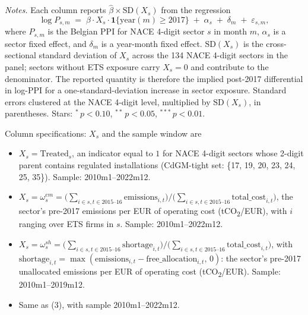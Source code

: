 \begin{table}[H]
    \begin{minipage}{0.95\textwidth}
        \footnotesize
        \vspace{0.5em}
        \emph{Notes.} Each column reports $\hat\beta \times \text{SD}(X_s)$ from the regression
        \[
            \log P_{s,m} \;=\; \beta \cdot X_s \cdot \mathbf{1}\{\text{year}(m) \geq 2017\} \;+\; \alpha_s \;+\; \delta_m \;+\; \varepsilon_{s,m},
        \]
        where $P_{s,m}$ is the Belgian PPI for NACE 4-digit sector $s$ in month $m$, $\alpha_s$ is a sector fixed effect, and $\delta_m$ is a year-month fixed effect. $\text{SD}(X_s)$ is the cross-sectional standard deviation of $X_s$ across the 134 NACE 4-digit sectors in the panel; sectors without ETS exposure carry $X_s = 0$ and contribute to the denominator. The reported quantity is therefore the implied post-2017 differential in log-PPI for a one-standard-deviation increase in sector exposure. Standard errors clustered at the NACE 4-digit level, multiplied by $\text{SD}(X_s)$, in parentheses. Stars: $^{*}\,p<0.10$, $^{**}\,p<0.05$, $^{***}\,p<0.01$.

        \vspace{0.5em}
        Column specifications: $X_s$ and the sample window are
        \begin{itemize}
            \item[(1)] $X_s = \text{Treated}_s$, an indicator equal to $1$ for NACE 4-digit sectors whose 2-digit parent contains regulated installations (CdGM-tight set: \{17, 19, 20, 23, 24, 25, 35\}). Sample: 2010m1--2022m12.
            \item[(2)] $X_s = \omega^{em}_s = \big(\sum_{i \in s, t \in 2015\text{--}16} \text{emissions}_{i,t}\big) / \big(\sum_{i \in s, t \in 2015\text{--}16} \text{total\_cost}_{i,t}\big)$, the sector's pre-2017 emissions per EUR of operating cost (tCO\textsubscript{2}/EUR), with $i$ ranging over ETS firms in $s$. Sample: 2010m1--2022m12.
            \item[(3)] $X_s = \omega^{sh}_s = \big(\sum_{i \in s, t \in 2015\text{--}16} \text{shortage}_{i,t}\big) / \big(\sum_{i \in s, t \in 2015\text{--}16} \text{total\_cost}_{i,t}\big)$, with $\text{shortage}_{i,t} = \max(\text{emissions}_{i,t} - \text{free\_allocation}_{i,t}, \, 0)$: the sector's pre-2017 unallocated emissions per EUR of operating cost (tCO\textsubscript{2}/EUR). Sample: 2010m1--2019m12.
            \item[(4)] Same as (3), with sample 2010m1--2022m12.
        \end{itemize}
    \end{minipage}
\end{table}

